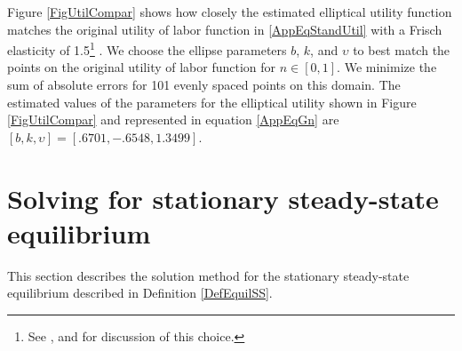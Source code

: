 \documentclass[letterpaper,12pt]{article}
\theoremstyle{definition}
\renewcommand\theenumi{\roman{enumi}}
\begin{document}
  Figure \ref{FigUtilCompar} shows how closely the estimated elliptical utility function matches the original utility of labor function in \eqref{AppEqStandUtil} with a Frisch elasticity of 1.5\footnote{See \citet{Chetty:2011}, \citet{KeaneRogerson:2012} and \citet{Peterman:2014} for discussion of this choice.} . We choose the ellipse parameters $b$, $k$, and $\upsilon$ to best match the points on the original utility of labor function for $n\in[0,1]$. We minimize the sum of absolute errors for 101 evenly spaced points on this domain. The estimated values of the parameters for the elliptical utility shown in Figure \ref{FigUtilCompar} and represented in equation \eqref{AppEqGn} are $[b,k,\upsilon] = [.6701,-.6548,1.3499]$.

  \clearpage


\newpage
\section{Solving for stationary steady-state equilibrium}\label{AppSSsolve}

  \setcounter{equation}{0}
  \renewcommand\theenumi{\arabic{enumi}}
  \renewcommand\theenumii{\alph{enumii}}
  \renewcommand\theenumiii{\roman{enumiii}}

  This section describes the solution method for the stationary steady-state equilibrium described in Definition \ref{DefEquilSS}.
\end{document}
